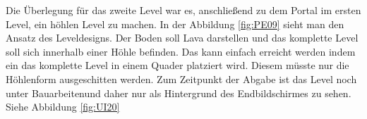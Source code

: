 Die Überlegung für das zweite Level war es, anschließend zu dem Portal im ersten Level, ein höhlen Level zu machen. In der Abbildung \ref{fig:PE09} sieht man den Ansatz des Leveldesigns. Der Boden soll Lava darstellen und das komplette Level soll sich innerhalb einer Höhle befinden. 
Das kann einfach erreicht werden indem ein das komplette Level in einem Quader platziert wird. Diesem müsste nur die Höhlenform ausgeschitten werden. Zum Zeitpunkt der Abgabe ist das Level noch unter \glqq Bauarbeiten\grqq \space und daher nur als Hintergrund des Endbildschirmes zu sehen. Siehe Abbildung \ref{fig:UI20}



\pagebreak


